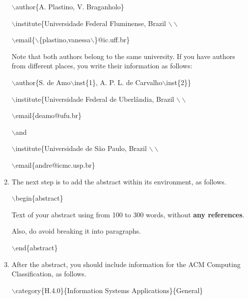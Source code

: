 \documentclass[kdmile,a4paper]{kdmile} %
\newenvironment{latexcode}
{\ttfamily\vspace{0.1in}\setlength{\parindent}{18pt}}
{\vspace{0.1in}}
\begin{document}
\begin{enumerate}
		\begin{latexcode}
				$\backslash$author\{A. Plastino, V. Braganholo\}
				
				$\backslash$institute\{Universidade Federal Fluminense, Brazil $\backslash\backslash$
				
				$\backslash$email\{$\backslash$\{plastino,vanessa$\backslash$\}@ic.uff.br\}
				
		\end{latexcode}
		
	Note that both authors belong to the same university. If you have authors from different places, you write their information as follows:
		
		\begin{latexcode}		
				$\backslash$author\{S. de Amo$\backslash$inst\{1\}, A. P. L. de Carvalho$\backslash$inst\{2\}\}
				
				$\backslash$institute\{Universidade Federal de Uberl\^andia, Brazil $\backslash\backslash$
				
				$\backslash$email\{deamo@ufu.br\} 
				
				$\backslash$and
				
				$\backslash$institute\{Universidade de S\~ao Paulo, Brazil $\backslash\backslash$
				
				$\backslash$email\{andre@icmc.usp.br\} 
 
		\end{latexcode}

		
	\item The next step is to add the abstract within its environment, as follows.
	
		\begin{latexcode}		
				$\backslash$begin\{abstract\}
				
Text of your abstract using from 100 to 300 words, without \textbf{any references}. 

Also, do avoid breaking it into paragraphs.
				
				$\backslash$end\{abstract\}
		\end{latexcode}
					
	\item After the abstract, you should include information for the ACM Computing Classification, as follows.
	
	\begin{latexcode}		
				$\backslash$category\{H.4.0\}\{Information Systems Applications\}\{General\}
	\end{latexcode}
	

\end{enumerate}
\end{document}
